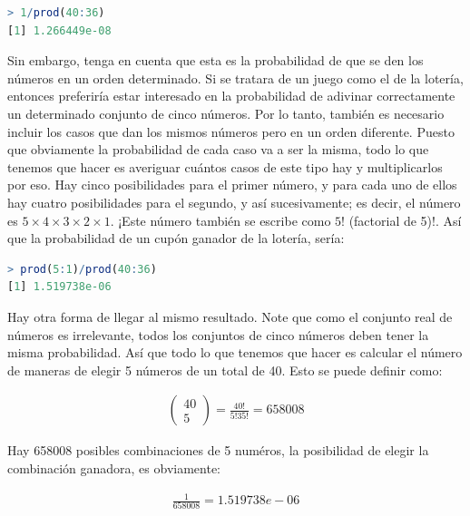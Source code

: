 \begin{lstlisting}[language=R]
> 1/prod(40:36)
[1] 1.266449e-08
\end{lstlisting}

Sin embargo, tenga en cuenta que esta es la probabilidad de que se den los
números en un orden determinado. Si se tratara de un juego como el de la
lotería, entonces preferiría estar interesado en la probabilidad de adivinar
correctamente un determinado conjunto de cinco números.  Por lo tanto, también
es necesario incluir los casos que dan los mismos números pero en un orden
diferente.  Puesto que obviamente la probabilidad de cada caso va a ser la
misma, todo lo que tenemos que hacer es averiguar cuántos casos de este tipo hay
y multiplicarlos por eso. Hay cinco posibilidades para el primer número, y para
cada uno de ellos hay cuatro posibilidades para el segundo, y así sucesivamente;
es decir, el número es $5 \times 4 \times 3 \times 2 \times 1$. ¡Este número
también se escribe como $5!$ (factorial de 5)!. Así que la probabilidad de un
cupón ganador de la lotería, sería:

\begin{lstlisting}[language=R]
> prod(5:1)/prod(40:36)
[1] 1.519738e-06
\end{lstlisting}

\newpage

Hay otra forma de llegar al mismo resultado. Note que como el conjunto real de
números es irrelevante, todos los conjuntos de cinco números deben tener la
misma probabilidad. Así que todo lo que tenemos que hacer es calcular el número
de maneras de elegir 5 números de un total de 40. Esto se puede definir como:

\begin{gather*}
\left(
    \begin{array}{c}
      40\\
      5
  \end{array}
\right) = \frac{40!}{5!35!} = 658008
\end{gather*}

\begin{tradnote}
    Hay 658008 posibles combinaciones de 5 numéros, la posibilidad de elegir la
    combinación ganadora, es obviamente:

    \begin{gather*}
    \frac{1}{658008} = 1.519738e-06
    \end{gather*}

\end{tradnote}

